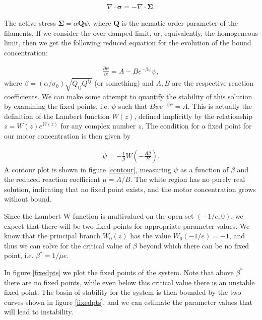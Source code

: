 \documentclass[onecolumn,showpacs,preprintnumbers,prl,amsmath,amssymb]{revtex4-1}
\def\b{\mathbf}
\begin{document}
\begin{gather}
\nabla\cdot\b{\sigma}=-\nabla\cdot\b{\Sigma}.
\end{gather}

The active stress $\b{\Sigma}=\alpha \b{Q}\psi$, where $\b{Q}$ is the nematic order parameter of the filaments. If we consider the over-damped limit, or, equivalently, the homogeneous limit, then we get the following reduced equation for the evolution of the bound concentration:

\begin{gather}
\frac{\partial\psi}{\partial t}=A-Be^{-\beta \psi}\psi,
\end{gather}
where $\beta=(\alpha/\sigma_0) \sqrt{Q_{ij}Q^{ij}}$ (or something) and $A,B$ are the respective reaction coefficients. We can make some attempt to quantify the stability of this solution by examining the fixed points, i.e. $\bar{\psi}$ such that $B\bar{\psi}e^{-\beta\bar{\psi}}=A$. This is actually the definition of the Lambert function $W(z)$, defined implicitly by the relationship $z=W(z)e^{W(z)}$ for any complex number $z$. The condition for a fixed point for our motor concentration is then given by

\begin{gather}
\bar{\psi}=-\frac{1}{\beta}W\left(-\frac{A\beta}{B}\right).
\end{gather}
A contour plot is shown in figure \ref{contour}, measuring $\bar{\psi}$ as a function of $\beta$ and the reduced reaction coefficient $\mu=A/B$. The white region has no purely real solution, indicating that no fixed point exists, and the motor concentration grows without bound.

Since the Lambert W function is multivalued on the open set $(-1/e,0)$, we expect that there will be two fixed points for appropriate parameter values. We know that the principal branch $W_0(z)$ has the value $W_0(-1/e)=-1$, and thus we can solve for the critical value of $\beta$ beyond which there can be no fixed point, i.e. $\beta^*=1/\mu e$.

In figure \ref{fixedpts} we plot the fixed points of the system. Note that above $\beta^*$ there are no fixed points, while even below this critical value there is an unstable fixed point. The basin of stability for the system is then bounded by the two curves shown in figure \ref{fixedpts}, and we can estimate the parameter values that will lead to instability.
\end{document}

